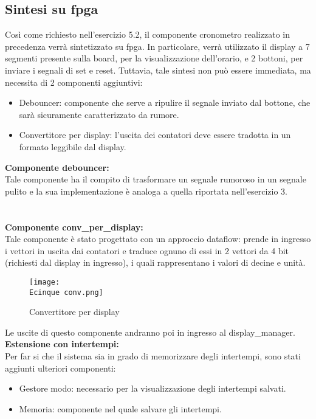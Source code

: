 \documentclass[12pt]{article}
\def \Ecinque {Allegati/Esercizio5/}
\begin{document}
\subsection{Sintesi su fpga}
Così come richiesto nell’esercizio 5.2, il componente cronometro realizzato in precedenza verrà sintetizzato su fpga. In particolare, verrà utilizzato il display a 7 segmenti presente sulla board, per la visualizzazione dell’orario, e 2 bottoni, per inviare i segnali di set e reset.
Tuttavia, tale sintesi non può essere immediata, ma  necessita di 2 componenti aggiuntivi:
\begin{itemize}
    \item Debouncer: componente che serve a ripulire il segnale inviato dal bottone, che sarà sicuramente caratterizzato da rumore.
    \item Convertitore per display: l’uscita dei contatori deve essere tradotta in un formato leggibile dal display.
\end{itemize}
{\large \textbf{Componente debouncer:}}
\\Tale componente ha il compito di trasformare un segnale rumoroso in un segnale pulito e la sua implementazione è analoga a quella riportata nell’esercizio 3.
\\\\\\{\large \textbf{Componente conv\_per\_display:}}
\\Tale componente è stato progettato con un approccio dataflow: prende in ingresso i vettori in uscita dai contatori e traduce ognuno di essi in 2 vettori da 4 bit (richiesti dal display in ingresso), i quali rappresentano i valori di decine e unità.
\clearpage
\begin{figure}[ht]
    \centering
    \texttt{[image: \\Ecinque conv.png]}
    \caption{Convertitore per display}
\end{figure}
Le uscite di questo componente andranno poi in ingresso al display\_manager.
\newline\newline\textbf{Estensione con intertempi:}
\\Per far si che il sistema sia in grado di memorizzare degli intertempi, sono stati aggiunti ulteriori componenti:
\begin{itemize}
    \item Gestore modo: necessario per la visualizzazione degli intertempi salvati.
    \item Memoria: componente nel quale salvare gli intertempi.
\end{itemize}
\end{document}
